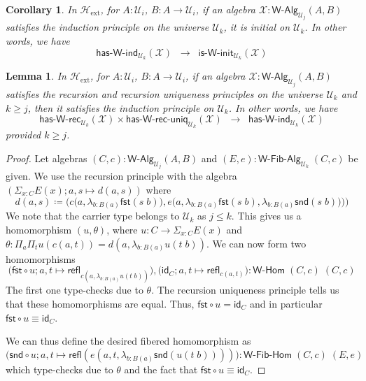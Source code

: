 \documentclass[reqno,10pt,a4paper,oneside]{amsart}
\newcommand{\X}{\mathcal{X}}
\newcommand{\fst}{\mathsf{fst}}
\newcommand{\snd}{\mathsf{snd}}
\newcommand{\comp}{\circ}
\newcommand{\idfun}[1]{\mathsf{id}_{#1}}
\newcommand{\prd}[1]{\Pi_{#1}}
\newcommand{\sm}[1]{\Sigma_{#1}}
\newcommand{\lam}[1]{\lambda_{#1}}
\newcommand{\defeq}{\coloneqq}
\newcommand{\refl}{\mathsf{refl}}
\newcommand{\W}{\mathsf{W}}
\newcommand{\UU}{\mathcal{U}}
\newcommand{\WAlg}{\mathsf{W}\text{-}\mathsf{Alg}}
\newcommand{\WFibAlg}{\mathsf{W}\text{-}\mathsf{Fib}\text{-}\mathsf{Alg}}
\newcommand{\WHom}{\mathsf{W}\text{-}\mathsf{Hom}}
\newcommand{\WFibHom}{\mathsf{W}\text{-}\mathsf{Fib}\text{-}\mathsf{Hom}}
\newcommand{\HasWRec}{\mathsf{has}\text{-}\mathsf{W}\text{-}\mathsf{rec}}
\newcommand{\HasWInd}{\mathsf{has}\text{-}\mathsf{W}\text{-}\mathsf{ind}}
\newcommand{\HasWRecUniq}{\mathsf{has}\text{-}\mathsf{W}\text{-}\mathsf{rec}\text{-}\mathsf{uniq}}
\newcommand{\IsWInit}{\mathsf{is}\text{-}\mathsf{\W}\text{-}\mathsf{init}}
\newcommand{\Hext}{\mathcal{H}_{\mathrm{ext}}}
\numberwithin{equation}{section}
\theoremstyle{mythm}
\newtheorem{lemma}[theorem]{Lemma}
\newtheorem{corollary}[theorem]{Corollary}
\theoremstyle{mydef}
\theoremstyle{myrmk}
\begin{document}

\begin{corollary}\label{lem:WIndImpInit}
In $\Hext$, for $A:\UU_i$, $B : A \to \UU_i$, if an algebra $\X : \WAlg_{\UU_j}(A,B)$ satisfies the induction principle on the universe $\UU_k$, it is initial on $\UU_k$. In other words, we have
\[ \HasWInd_{\UU_k}(\X) \;\; \rightarrow \;\; \IsWInit_{\UU_k}(\X) \]
\end{corollary}

\begin{lemma}\label{lem:WRecUniqImpInd}
In $\Hext$, for $A:\UU_i$, $B : A \to \UU_i$, if an algebra $\X : \WAlg_{\UU_j}(A,B)$ satisfies the recursion and recursion uniqueness principles on the universe $\UU_k$ and $k \geq j$, then it satisfies the induction principle on $\UU_k$. In other words, we have
\[ \HasWRec_{\UU_k}(\X) \times \HasWRecUniq_{\UU_k}(\X) \;\; \rightarrow \; \; \HasWInd_{\UU_k}(\X) \]
provided $k \geq j$.
\end{lemma}
\begin{proof}
Let algebras $(C,c) : \WAlg_{\UU_j}(A,B)$ and $(E,e) : \WFibAlg_{\UU_k} \; (C,c)$ be given. 
We use the recursion principle with the algebra $(\sm{x:C} E(x); a,s \mapsto d(a,s))$ where
\[ d(a,s) \defeq \Big(c\big(a,\lam{b:B(a)} \fst(s\;b)\big), e\big(a, \lam{b:B(a)} \fst(s\;b), \lam{b:B(a)} \snd(s\;b)\big) \Big) \big) \]
We note that the carrier type belongs to $\UU_k$ as $j \leq k$. This gives us a homomorphism $(u,\theta)$, where $u : C \to \sm{x:C} E(x)$ and $\theta : \prd{a}\prd{t} u(c(a,t)) = d(a,\lam{b:B(a)}u(t\;b))$. We can now form two homomorphisms 
\[\big(\fst \comp u; a,t \mapsto \refl_{c(a,\lam{b:B(a)}u(t\;b))}\big), \big(\idfun{C}; a,t \mapsto \refl_{c(a,t)}\big) : \WHom \; (C,c) \; (C,c)\] The first one type-checks due to $\theta$. The recursion uniqueness principle tells us that these homomorphisms are equal. Thus, $\fst \comp u = \idfun{C}$ and in particular $\fst \comp u \equiv \idfun{C}$. 

We can thus define the desired fibered homomorphism as \[\big(\snd \comp u; a,t \mapsto \refl(e(a,t,\lam{b:B(a)}\snd(u(t\;b))))\big) : \WFibHom \; (C,c) \; (E,e)\]
which type-checks due to $\theta$ and the fact that $\fst \comp u \equiv \idfun{C}$.
\end{proof}
\end{document}
